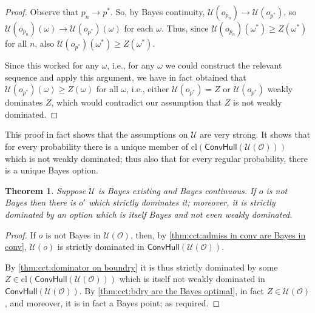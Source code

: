 \documentclass[a4paper]{article}
\newtheorem{theorem}{Theorem}
\newcommand\cl{\mathrm{cl}}
\renewcommand\O{\mathcal{O}}
\newcommand\Uwald{\mathcal{U}} %
\newcommand{\Conv}{\mathsf{ConvHull}}
\renewcommand{\geq}{\geqslant}
\newenvironment{CCM rewritten}
{\begingroup\color{blue}} %
{\endgroup}              %
\begin{document}
\begin{proof}
		Observe that $p_n\longrightarrow p^*$. So, by Bayes continuity, $\Uwald(o_{p_n})\longrightarrow \Uwald(o_{p^*})$, so $\Uwald(o_{p_n})({\omega})\longrightarrow \Uwald(o_{p^*})({\omega})$ for each ${\omega}$. Thus, since $\Uwald(o_{p_n})({\omega^*})\geq Z({\omega^*})$ for all $n$, also $\Uwald(o_{p^*})(\omega^*)\geq Z(\omega^*)$. 
		
		Since this worked for any $\omega$, i.e., for any $\omega$ we could construct the relevant sequence and apply this argument, we have in fact obtained that $\Uwald(o_{p^*})(\omega)\geq Z(\omega)$ for all $\omega$, i.e., either $\Uwald(o_{p^*})=Z$ or $\Uwald(o_{p^*})$ weakly dominates $Z$, which would contradict our assumption that $Z$ is not weakly dominated. 
	\end{proof}
	This proof in fact shows that the assumptions on $\Uwald$ are very strong. It shows that for every probability there is a unique member of $\cl(\Conv(\Uwald(\O)))$ which is not weakly dominated; thus also that for every regular probability, there is a unique Bayes option. 
	
%		
	\begin{theorem}\label{thm:cct}
		Suppose $\Uwald$ is Bayes existing and Bayes continuous. If $o$ is not Bayes then there is $o'$ which strictly dominates it; moreover, it is strictly dominated by an option which is itself Bayes and not even weakly dominated. 
	\end{theorem}
\begin{proof}
			If $o$ is not Bayes in $\Uwald(\O)$, then, by \cref{thm:cct:admiss in conv are Bayes in conv}, $\Uwald(o)$ is strictly dominated in $\Conv(\Uwald(\O))$. 
	
	By \cref{thm:cct:dominator on boundry} it is thus strictly dominated by some $Z\in\cl(\Conv(\Uwald(\O)))$ which is itself not weakly dominated in $\Conv(\Uwald(\O))$. By \cref{thm:cct:bdry are the Bayes optimal}, in fact $Z\in \Uwald(\O)$, and moreover, it is in fact a Bayes point; as required.
\end{proof}
\end{document}
